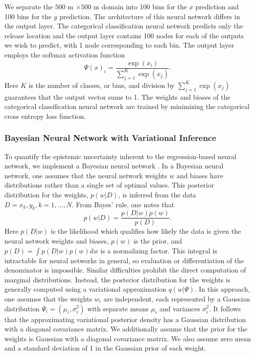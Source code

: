\documentclass[sn-mathphys-ay]{sn-jnl}
\begin{document}
We separate the $500$ m $\times 500$ m domain into 100 bins for the $x$ prediction and 100 bins for the $y$ prediction. The architecture of this neural network differs in the output layer. The categorical classification neural network predicts only the release location and the output layer contains 100 nodes for each of the outputs we wish to predict, with 1 node corresponding to each bin. The output layer employs the softmax activation function
\begin{equation}
\label{eq:softmax}
\Psi(x)_i= \frac{\exp(x_i)}{\sum_{j=1}^K\exp(x_j)}.
\end{equation} 
Here $K$ is the number of classes, or bins, and division by $\sum_{j=1}^K\exp(x_j)$ guarantees that the output vector sums to 1. The weights and biases of the categorical classification neural network are trained by minimizing the categorical cross entropy loss function.

\subsubsection{Bayesian Neural Network with Variational Inference}
\label{sec:Bayesian_NN}
To quantify the epistemic uncertainty inherent to the regression-based neural network, we implement a Bayesian neural network \citep{Cinelli}. In a Bayesian neural network, one assumes that the neural network weights $w$ and biases have distributions rather than a single set of optimal values. This posterior distribution for the weights, $p(w | D)$, is inferred from the data $D={x_k, y_k, k=1, \dots, N}$. From Bayes' rule, one notes that
\begin{equation}
\label{eq:Bayes_rule}
p(w | D)=\frac{p(D | w) p(w)}{p(D)}.
\end{equation} 
Here $p(D | w)$ is the likelihood which qualifies how likely the data is given the neural network weights and biases, $p(w)$ is the prior, and $p(D)=\int p(D | w) p(w) dw$ is a normalizing factor. This integral is intractable for neural networks in general, so evaluation or differentiation of the denominator is impossible. Similar difficulties prohibit the direct computation of marginal distributions. Instead, the posterior distribution for the weights is generally computed using a variational approximation $q(w | \Psi)$. In this approach, one assumes that the weights $w_i$ are independent, each represented by a Gaussian distribution $\Psi_i=(\mu_i, \sigma_i^2)$ with separate means $\mu_i$ and variances $\sigma_i^2$. It follows that the approximating variational posterior density has a Gaussian distribution with a diagonal covariance matrix. We additionally assume that the prior for the weights is Gaussian with a diagonal covariance matrix. We also assume zero mean and a standard deviation of 1 in the Gaussian prior of each weight.
\end{document}
